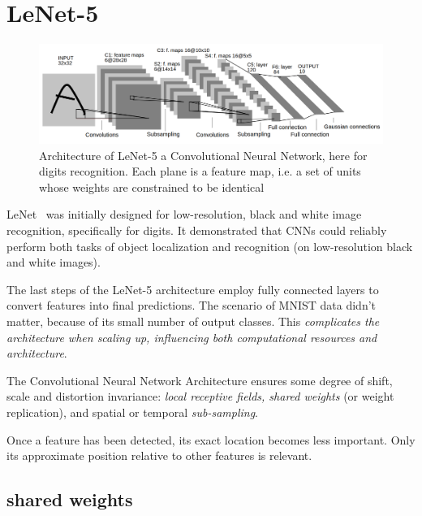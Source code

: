 \documentclass[11pt]{article}
\begin{document}


\tableofcontents

\clearpage

\section{LeNet-5}

\begin{figure}[H]
    \centering
    \includegraphics[width=\linewidth]{figures/LeNetFigure.png}
    \caption{Architecture of LeNet-5 a Convolutional Neural Network, here for digits recognition. Each plane is a feature map, i.e. a set of units
    whose weights are constrained to be identical~\cite{LeNet}}
\end{figure}



LeNet~\cite{LeNet} was initially designed for low-resolution, black and white image recognition, specifically for digits. It demonstrated that CNNs could reliably perform both tasks of object localization and recognition (on low-resolution black and white images).

The last steps of the LeNet-5 architecture employ fully connected layers to convert features into final predictions. The scenario of MNIST data didn't matter, because of its small number of output classes. This \textit{complicates the architecture when scaling up, influencing both computational resources and architecture}.

The Convolutional Neural Network Architecture ensures some degree of shift, scale and distortion invariance: \textit{local receptive fields, shared weights} (or weight replication), and spatial or temporal \textit{sub-sampling}.

Once a feature has been detected, its exact location
becomes less important. Only its approximate position
relative to other features is relevant.

\subsection{shared weights}
\end{document}
